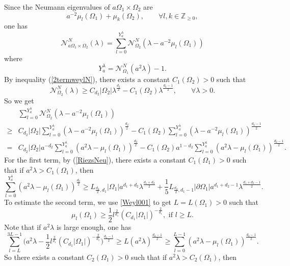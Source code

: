 \documentclass[11pt,letterpaper]{amsart}
\numberwithin{equation}{section}
\theoremstyle{plain}
\theoremstyle{plain}
\numberwithin{equation}{section}
\theoremstyle{remark}
\begin{document}
	Since the Neumann eigenvalues of $a\Omega_1 \times \Omega_2$ are 
	\[
	a^{-2}\mu_l(\Omega_1)+ \mu_k(\Omega_2), \qquad \forall l,k\in \mathbb Z_{\ge 0},
	\]
	one has
	\[
	\mathcal N^N_{a\Omega_1\times \Omega_2}(\lambda)= \sum_{l=0}^{Y_a^\lambda} \mathcal N^N_{\Omega_2} (\lambda- a^{-2}\mu_l(\Omega_1))
	\]
	where
	\[
	Y_a^\lambda= \mathcal N^N_{\Omega_1}(a^2\lambda)-1.
	\]	
	By inequality (\ref{2termweylN}), there exists a constant $C_1(\Omega_2)>0$ such that
	\[
	\mathcal N^N_{\Omega_2}(\lambda)\ge C_{d_2}|\Omega_2|\lambda^{\frac{d_2}{2}}- C_1(\Omega_2)\lambda^{\frac{d_2-1}{2}}, \qquad \forall \lambda>0.
	\]
	So we get
	\begin{equation}\label{gogogo}
		\begin{aligned}
			&\sum_{l=0}^{Y_a^\lambda} \mathcal N^N_{\Omega_2} (\lambda- a^{-2}\mu_l(\Omega_1))\\
			\ge&C_{d_2}|\Omega_2| \sum_{l=0}^{Y_a^\lambda} (\lambda- a^{-2}\mu_l(\Omega_1))^{\frac{d_2}{2}}- C_1(\Omega_2) \sum_{l=0}^{Y_a^\lambda} (\lambda- a^{-2}\mu_l(\Omega_1))^{\frac{d_2-1}{2}}\\
			=  &C_{d_2}|\Omega_2|a^{-d_2} \sum_{l=0}^{Y_a^\lambda} (a^2\lambda- \mu_l(\Omega_1))^{\frac{d_2}{2}}- C_1(\Omega_2)a^{1-d_2} \sum_{l=0}^{Y_a^\lambda} (a^2\lambda- \mu_l(\Omega_1))^{\frac{d_2-1}{2}}.
		\end{aligned}
	\end{equation}
	For the first term, by  (\ref{RiezsNeu}), there exists a constant $C_1(\Omega_1)>0$ such that if $a^2\lambda> C_1(\Omega_1)$, then
	\begin{equation}\label{gogogo1} 
		\sum_{l=0}^{Y_a^\lambda}(a^2\lambda- \mu_l(\Omega_1))^{\frac{d_2}{2}}\ge L_{\frac{d_2}{2},d_1}|\Omega_1|a^{d_1+d_2}\lambda^{\frac{d_1+d_2}{2}}+ \frac{1}{5} L_{\frac{d_2}{2}, d_1-1} |\partial \Omega_1|a^{d_1+d_2-1}\lambda^{\frac{d_1+d_2-1}{2}}.
	\end{equation}
	To estimate the second term, we use \eqref{Weyl001} to get $L=L(\Omega_1)>0$ such that 
	\[
	\mu_l(\Omega_1)\ge \frac{1}{2} l^{\frac{2}{d_1}} (C_{d_1}|\Omega_1|)^{-\frac{2}{d_1}}, \text{ if }l\ge L.
	\]
	Note that if $a^2\lambda$ is large enough, one has	
	\[
	\sum_{l=L}^{3L-1}\big(a^2\lambda- \frac{1}{2} l^{\frac{2}{d_1}}(C_{d_1}|\Omega_1|)^{-\frac{2}{d_1}} \big)^{\frac{d_2-1}{2}} 
	\ge  L (a^2\lambda)^{\frac{d_2-1}{2}}\ge \sum_{l=0}^{L-1} (a^2\lambda- \mu_l(\Omega_1))^{\frac{d_2-1}{2}}. 
	\] 
	So there exists a constant $C_2(\Omega_1)> 0$ such that if $a^2\lambda> C_2(\Omega_1)$, then
\end{document}
